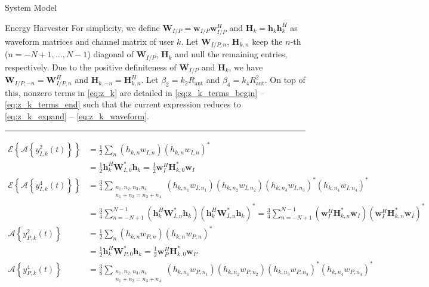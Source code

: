 \documentclass{IEEEtran}
\begin{document}
\begin{section}{System Model}
\begin{subsection}{Energy Harvester}
		For simplicity, we define $\boldsymbol{W}_{I/P}=\boldsymbol{w}_{I/P}\boldsymbol{w}_{I/P}^H$ and $\boldsymbol{H}_k=\boldsymbol{h}_k\boldsymbol{h}_k^H$ as waveform matrices and channel matrix of user $k$. Let $\boldsymbol{W}_{I/P,n}$, $\boldsymbol{H}_{k,n}$ keep the $n$-th ($n=-N+1,\dots,N-1$) diagonal of $\boldsymbol{W}_{I/P}$, $\boldsymbol{H}_k$ and null the remaining entries, respectively. Due to the positive definiteness of $\boldsymbol{W}_{I/P}$ and $\boldsymbol{H}_k$, we have $\boldsymbol{W}_{I/P,-n}=\boldsymbol{W}_{I/P,n}^H$ and $\boldsymbol{H}_{k,-n}=\boldsymbol{H}_{k,n}^H$. Let $\beta_2={k_2}{R_{\text{ant}}}$ and $\beta_4={k_4}{R_{\text{ant}}^2}$. On top of this, nonzero terms in \ref{eq:z_k} are detailed in \ref{eq:z_k_terms_begin} -- \ref{eq:z_k_terms_end} such that the current expression reduces to \ref{eq:z_k_expand} -- \ref{eq:z_k_waveform}.
		\begin{figure*}[b]
			\hrule
			\begin{align}
				\mathcal{E}\left\{\mathcal{A}\left\{y_{I,k}^2(t)\right\}\right\}
				& = \frac{1}{2}\sum_n{(h_{k,n}w_{I,n})(h_{k,n}w_{I,n})^*}\label{eq:z_k_terms_begin}\\
				& = \frac{1}{2}\boldsymbol{h}_k^H\boldsymbol{W}_{I,0}^*\boldsymbol{h}_k = \frac{1}{2}\boldsymbol{w}_I^H\boldsymbol{H}_{k,0}^*\boldsymbol{w}_I\\
				\mathcal{E}\left\{\mathcal{A}\left\{y_{I,k}^4(t)\right\}\right\}
				& = \frac{3}{4}\sum_{\substack{{n_1},{n_2},{n_3},{n_4}\\{n_1}+{n_2}={n_3}+{n_4}}}{(h_{k,{n_1}}w_{I,{n_1}})(h_{k,{n_2}}w_{I,{n_2}})(h_{k,{n_3}}w_{I,{n_3}})^*(h_{k,{n_4}}w_{I,{n_4}})^*}\\
				& = \frac{3}{4}\sum_{n=-N+1}^{N-1}(\boldsymbol{h}_k^H\boldsymbol{W}_{I,n}^*\boldsymbol{h}_k)(\boldsymbol{h}_k^H\boldsymbol{W}_{I,n}^*\boldsymbol{h}_k)^* = \frac{3}{4}\sum_{n=-N+1}^{N-1}(\boldsymbol{w}_I^H\boldsymbol{H}_{k,n}^*\boldsymbol{w}_I)(\boldsymbol{w}_I^H\boldsymbol{H}_{k,n}^*\boldsymbol{w}_I)^*\\
				\mathcal{A}\left\{y_{P,k}^2(t)\right\}
				& = \frac{1}{2}\sum_n{(h_{k,n}w_{P,n})(h_{k,n}w_{P,n})^*}\\
				& = \frac{1}{2}\boldsymbol{h}_k^H\boldsymbol{W}_{P,0}^*\boldsymbol{h}_k = \frac{1}{2}\boldsymbol{w}_P^H\boldsymbol{H}_{k,0}^*\boldsymbol{w}_P\\
				\mathcal{A}\left\{y_{P,k}^4(t)\right\}
				& = \frac{3}{8}\sum_{\substack{{n_1},{n_2},{n_3},{n_4}\\{n_1}+{n_2}={n_3}+{n_4}}}{(h_{k,{n_1}}w_{P,{n_1}})(h_{k,{n_2}}w_{P,{n_2}})(h_{k,{n_3}}w_{P,{n_3}})^*(h_{k,{n_4}}w_{P,{n_4}})^*}\\

\end{align}
\end{figure*}
\end{subsection}
\end{section}
\end{document}
